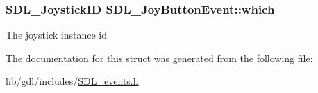 \subsubsection[{which}]{\setlength{\rightskip}{0pt plus 5cm}S\+D\+L\+\_\+\+Joystick\+I\+D S\+D\+L\+\_\+\+Joy\+Button\+Event\+::which}\label{struct_s_d_l___joy_button_event_a1679049adad7242b28420948fdc79044}
The joystick instance id 

The documentation for this struct was generated from the following file\+:\begin{DoxyCompactItemize}
\item 
lib/gdl/includes/\hyperlink{_s_d_l__events_8h}{S\+D\+L\+\_\+events.\+h}\end{DoxyCompactItemize}
